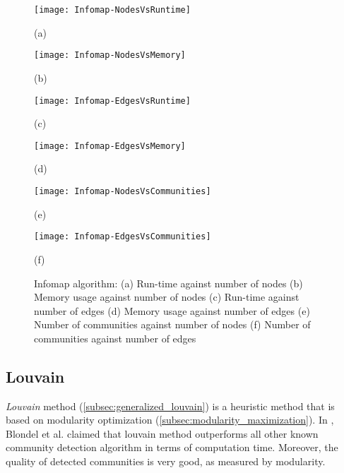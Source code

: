 \begin{figure}[H]
  \centering
  \begin{minipage}[b]{0.4\textwidth}
    \texttt{[image: Infomap-NodesVsRuntime]}
    \caption*{(a)}
  \end{minipage}
  \begin{minipage}[b]{0.4\textwidth}
    \texttt{[image: Infomap-NodesVsMemory]}
    \caption*{(b)}
  \end{minipage}
  \begin{minipage}[b]{0.4\textwidth}
    \texttt{[image: Infomap-EdgesVsRuntime]}
    \caption*{(c)}
  \end{minipage}
  \begin{minipage}[b]{0.4\textwidth}
    \texttt{[image: Infomap-EdgesVsMemory]}
    \caption*{(d)}
  \end{minipage}
  \begin{minipage}[b]{0.4\textwidth}
    \texttt{[image: Infomap-NodesVsCommunities]}
    \caption*{(e)}
  \end{minipage}
  \begin{minipage}[b]{0.4\textwidth}
    \texttt{[image: Infomap-EdgesVsCommunities]}
    \caption*{(f)}
  \end{minipage}
  \caption{Infomap algorithm: (a) Run-time against number of nodes (b) Memory usage against number of nodes (c) Run-time against number of edges (d) Memory usage against number of edges (e) Number of communities against number of nodes (f) Number of communities against number of edges}
  \label{fig:infomap_runs}
\end{figure}


\subsection{Louvain}
\textit{Louvain} method (\ref{subsec:generalized_louvain}) is a heuristic method that is based on modularity optimization (\ref{subsec:modularity_maximization}). In \cite{ref-27}, Blondel et al. claimed that louvain method outperforms all other known community detection algorithm in terms of computation time. Moreover, the quality of detected communities is very good, as measured by modularity.

